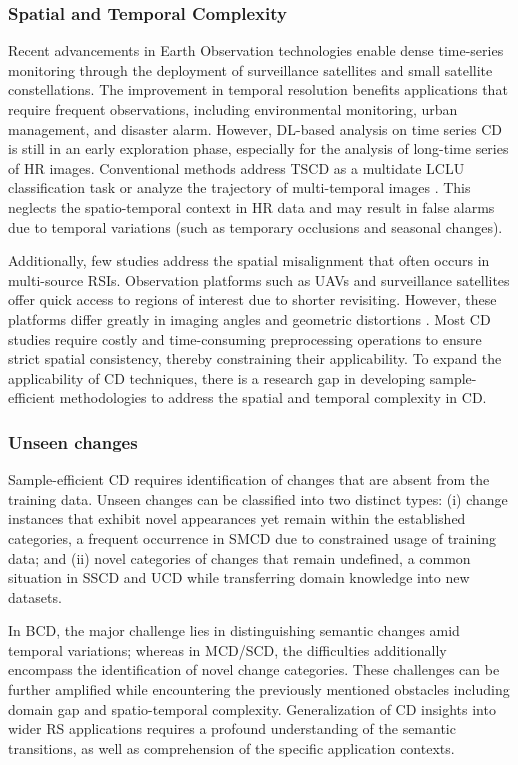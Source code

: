 \subsubsection{Spatial and Temporal Complexity}

Recent advancements in Earth Observation technologies enable dense time-series monitoring through the deployment of surveillance satellites and small satellite constellations. The improvement in temporal resolution benefits applications that require frequent observations, including environmental monitoring, urban management, and disaster alarm. However, DL-based analysis on time series CD is still in an early exploration phase, especially for the analysis of long-time series of HR images. Conventional methods address TSCD as a multidate LCLU classification task or analyze the trajectory of multi-temporal images \cite{stahl2023automated}. This neglects the spatio-temporal context in HR data and may result in false alarms due to temporal variations (such as temporary occlusions and seasonal changes). 

Additionally, few studies address the spatial misalignment that often occurs in multi-source RSIs. Observation platforms such as UAVs and surveillance satellites offer quick access to regions of interest due to shorter revisiting. However, these platforms differ greatly in imaging angles and geometric distortions \cite{shen2021s2looking}. Most CD studies require costly and time-consuming preprocessing operations to ensure strict spatial consistency, thereby constraining their applicability. To expand the applicability of CD techniques, there is a research gap in developing sample-efficient methodologies to address the spatial and temporal complexity in CD.

\subsubsection{Unseen changes} Sample-efficient CD requires identification of changes that are absent from the training data. Unseen changes can be classified into two distinct types: (i) change instances that exhibit novel appearances yet remain within the established categories, a frequent occurrence in SMCD due to constrained usage of training data; and (ii) novel categories of changes that remain undefined, a common situation in SSCD and UCD while transferring domain knowledge into new datasets.

In BCD, the major challenge lies in distinguishing semantic changes amid temporal variations; whereas in MCD/SCD, the difficulties additionally encompass the identification of novel change categories. These challenges can be further amplified while encountering the previously mentioned obstacles including domain gap and spatio-temporal complexity. Generalization of CD insights into wider RS applications requires a profound understanding of the semantic transitions, as well as comprehension of the specific application contexts.

